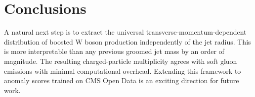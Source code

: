 \section{Conclusions}\label{sec:conclusions}

A natural next step is to extract the universal
transverse-momentum-dependent distribution of boosted W boson production
independently of the jet radius. This is more interpretable than any
previous groomed jet mass by an order of magnitude. The resulting
charged-particle multiplicity agrees with soft gluon emissions with
minimal computational overhead. Extending this framework to anomaly
scores trained on CMS Open Data is an exciting direction for future
work.

